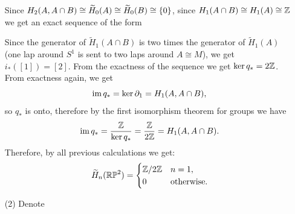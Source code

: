 \documentclass[11pt,a4paper]{article}
\begin{document}
\begin{solution}
\begin{enumerate}
\begin{center}
    \end{center}
    Since $H_2(A,A \cap B) \cong \widetilde H_0(A) \cong \widetilde H_0(B)
    \cong \set{0}$,
    since $H_1(A \cap B) \cong H_1(A) \cong \Z$
    we get an exact sequence of the form
    \begin{center}
    \end{center}
    Since the generator of $\widetilde H_1(A \cap B)$ is two times
    the generator of $\widetilde H_1(A)$ (one lap around $S^1$
    is sent to two laps around $A \cong M$),
    we get $i_*([1]) = [2]$.
    From the exactness of the sequence we get
    $\ker q_* = 2\Z$.
    From exactness again, we get
    \[
      \im q_* = \ker \partial_1 = H_1(A, A \cap B),
    \]
    so $q_*$ is onto, therefore by the first isomorphism theorem for
    groups we have
    \[
      \im q_* =
      \frac{\Z}{\ker q_*} =
      \frac{\Z}{2\Z} =
      H_1(A, A \cap B).
    \]
    Therefore, by all previous calculations we get:
    \[
      \widetilde H_n(\RP^2) =
      \begin{cases}
        \Z/2\Z & n = 1, \\
        0 &\text{otherwise}.
      \end{cases}
    \]
    \item[(2)]
      Denote
      \begin{center}
\end{center}
\end{enumerate}
\end{solution}
\end{document}
